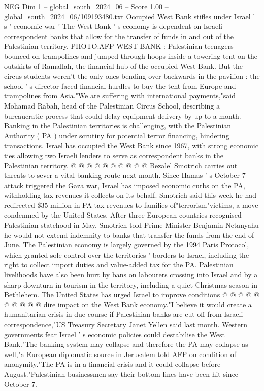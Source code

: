 \begin{textsample}{NEG Dim 1 – global\_south\_2024\_06 – Score 1.00 – global\_south\_2024\_06/109193480.txt}  \label{ex:f1_neg_325}
Occupied West Bank stifles under Israel ' s ' economic war ' The West Bank ' s economy is dependent on Israeli correspondent banks that allow for the transfer of funds in and out of the Palestinian territory.
PHOTO:AFP WEST BANK : Palestinian teenagers bounced on trampolines and jumped through hoops inside a towering tent on the outskirts of Ramallah, the financial hub of the occupied West Bank.
But the circus students weren't the only ones bending over backwards in the pavilion : the school ' s director faced financial hurdles to buy the tent from Europe and trampolines from Asia."We are suffering with international payments,"said Mohamad Rabah, head of the Palestinian Circus School, describing a bureaucratic process that could delay equipment delivery by up to a month.
Banking in the Palestinian territories is challenging, with the Palestinian Authority ( PA ) under scrutiny for potential terror financing, hindering transactions.
Israel has occupied the West Bank since 1967, with strong economic ties allowing two Israeli lenders to serve as correspondent banks in the Palestinian territory. @ @ @ @ @ @ @ @ @ @ Bezalel Smotrich carries out threats to sever a vital banking route next month.
Since Hamas ' s October 7 attack triggered the Gaza war, Israel has imposed economic curbs on the PA, withholding tax revenues it collects on its behalf.
Smotrich said this week he had redirected \$35 million in PA tax revenues to families of"terrorism"victims, a move condemned by the United States.
After three European countries recognised Palestinian statehood in May, Smotrich told Prime Minister Benjamin Netanyahu he would not extend indemnity to banks that transfer the funds from the end of June.
The Palestinian economy is largely governed by the 1994 Paris Protocol, which granted sole control over the territories ' borders to Israel, including the right to collect import duties and value-added tax for the PA.
Palestinian livelihoods have also been hurt by bans on labourers crossing into Israel and by a sharp downturn in tourism in the territory, including a quiet Christmas season in Bethlehem.
The United States has urged Israel to improve conditions @ @ @ @ @ @ @ @ @ @ dire impact on the West Bank economy."I believe it would create a humanitarian crisis in due course if Palestinian banks are cut off from Israeli correspondence,"US Treasury Secretary Janet Yellen said last month.
Western governments fear Israel ' s economic policies could destabilise the West Bank."The banking system may collapse and therefore the PA may collapse as well,"a European diplomatic source in Jerusalem told AFP on condition of anonymity."The PA is in a financial crisis and it could collapse before August."Palestinian businessmen say their bottom lines have been hit since October 7.

\end{textsample}
